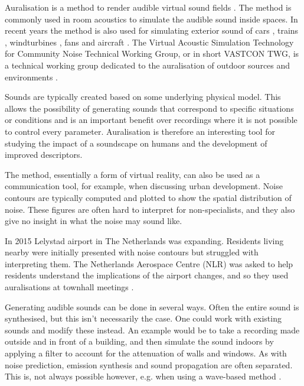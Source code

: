 Auralisation is a method to render audible virtual sound fields \cite{Kleiner1993}.
The method is commonly used in room acoustics to simulate the audible sound inside spaces.
In recent years the method is also used for simulating exterior sound of
cars \cite{Forssen2009,Maillard2012,Pieren2015,Hoffmann2016,Hoffmann2016a},
trains \cite{Pieren2016},
windturbines \cite{Pieren2014,Heutschi2014},
fans \cite{Merino2016} and
aircraft \cite{Arntzen2014a, Rizzi2016a, Rizzi2016}.
The Virtual Acoustic Simulation Technology for Community Noise Technical Working
Group, or in short VASTCON TWG, is a technical working group dedicated to the
auralisation of outdoor sources and environments \cite{Vastcon}.

Sounds are typically created based on some underlying physical model. This
allows the possibility of generating sounds that correspond to specific
situations or conditions and is an important benefit over recordings where it is
not possible to control every parameter. Auralisation is therefore an
interesting tool for studying the impact of a soundscape on humans and the
development of improved descriptors.

The method, essentially a form of virtual reality, can also be used as a
communication tool, for example, when discussing urban development. Noise
contours are typically computed and plotted to show the spatial distribution of
noise. These figures are often hard to interpret for non-specialists, and
they also give no insight in what the noise may sound like.

In 2015 Lelystad airport in The Netherlands was expanding. Residents living
nearby were initially presented with noise contours but struggled with
interpreting them. The Netherlands Aerospace Centre (NLR) was asked to help
residents understand the implications of the airport changes, and so they used
auralisations at townhall meetings \cite{Arntzen2015}.

Generating audible sounds can be done in several ways. Often the entire sound is
synthesised, but this isn't necessarily the case. One could work with existing
sounds and modify these instead. An example would be to take a recording made
outside and in front of a building, and then simulate the sound indoors by applying a
filter to account for the attenuation of walls and windows.
As with noise prediction, emission synthesis and sound propagation are often
separated. This is, not always possible however, e.g. when using a wave-based
method \cite{Hornikx2016,Georgiou2016,Georgiou2016a}.


